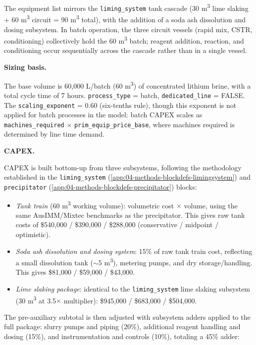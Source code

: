 The equipment list mirrors the \texttt{liming\_system} tank cascade (30 \si{m^3} lime slaking + 60 \si{m^3} circuit = 90 \si{m^3} total), with the addition of a soda ash dissolution and dosing subsystem. In batch operation, the three circuit vessels (rapid mix, CSTR, conditioning) collectively hold the 60 \si{m^3} batch; reagent addition, reaction, and conditioning occur sequentially across the cascade rather than in a single vessel.

\medskip
\noindent\textbf{Sizing basis.}\quad

The base volume is 60,000 L/batch (60 \si{m^3}) of concentrated lithium brine, with a total cycle time of 7 hours. \texttt{process\_type} = batch, \texttt{dedicated\_line} = FALSE. The \texttt{scaling\_exponent} = 0.60 (six-tenths rule), though this exponent is not applied for batch processes in the model: batch CAPEX scales as \texttt{machines\_required} $\times$ \texttt{prim\_equip\_price\_base}, where machines required is determined by line time demand.

\medskip
\noindent\textbf{CAPEX.}\quad

CAPEX is built bottom-up from three subsystems, following the methodology established in the \texttt{liming\_system} (\ref{app:04-methods-blockdefs-limingsystem}) and \texttt{precipitator} (\ref{app:04-methods-blockdefs-precipitator}) blocks:

\begin{itemize}[noitemsep]
	\item \textit{Tank train} (60 \si{m^3} working volume): volumetric cost $\times$ volume, using the same AusIMM/Mixtec benchmarks as the precipitator. This gives raw tank costs of \$540,000 / \$390,000 / \$288,000 (conservative / midpoint / optimistic).
	\item \textit{Soda ash dissolution and dosing system}: 15\% of raw tank train cost, reflecting a small dissolution tank ($\sim$5 \si{m^3}), metering pumps, and dry storage/handling. This gives \$81,000 / \$59,000 / \$43,000.
	\item \textit{Lime slaking package}: identical to the \texttt{liming\_system} lime slaking subsystem (30 \si{m^3} at 3.5$\times$ multiplier): \$945,000 / \$683,000 / \$504,000.
\end{itemize}

The pre-auxiliary subtotal is then adjusted with subsystem adders applied to the full package: slurry pumps and piping (20\%), additional reagent handling and dosing (15\%), and instrumentation and controls (10\%), totaling a 45\% adder:

